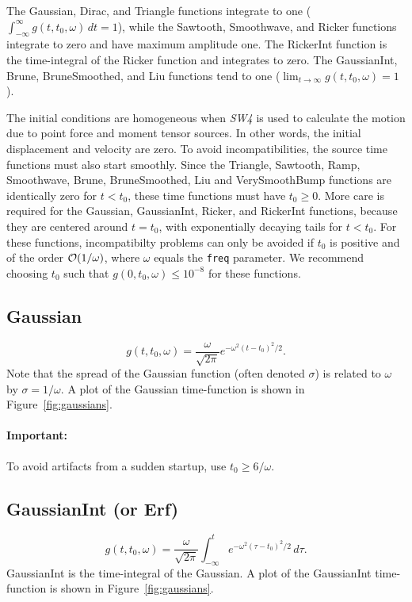 \documentclass[11pt]{report}
\begin{document}
The Gaussian, Dirac, and Triangle functions integrate to one ($\int_{-\infty}^{\infty}
g(t,t_0,\omega) \, dt = 1$), while the Sawtooth, Smoothwave, and Ricker functions integrate to zero
and have maximum amplitude one. The RickerInt function is the time-integral of the Ricker function
and integrates to zero. The GaussianInt, Brune, BruneSmoothed, and Liu functions tend to one
($\lim_{t\to\infty} g(t,t_0,\omega) = 1$).

The initial conditions are homogeneous when \emph{SW4} is used to calculate the motion due to point
force and moment tensor sources. In other words, the initial displacement and velocity are zero. To
avoid incompatibilities, the source time functions must also start smoothly. Since the Triangle,
Sawtooth, Ramp, Smoothwave, Brune, BruneSmoothed, Liu and VerySmoothBump functions are identically
zero for $t<t_0$, these time functions must have $t_0\geq 0$. More care is required for the
Gaussian, GaussianInt, Ricker, and RickerInt functions, because they are centered around $t=t_0$,
with exponentially decaying tails for $t<t_0$. For these functions, incompatibilty problems can only
be avoided if $t_0$ is positive and of the order ${\cal O}(1/\omega)$, where $\omega$ equals the
{\tt freq} parameter. We recommend choosing $t_0$ such that $g(0,t_0,\omega) \leq 10^{-8}$ for these
functions.

\subsection{Gaussian}\label{gaussian}
  \[
  g(t,t_0,\omega) = \dfrac{\omega}{\sqrt{2 \pi}} e^{-\omega^2 (t - t_0)^2 /2}.
  \] 
Note that the spread of the Gaussian function (often denoted $\sigma$) is related to $\omega$ by
$\sigma = 1 / \omega$. A plot of the Gaussian time-function is shown
in Figure~\ref{fig:gaussians}.
\paragraph{Important:} To avoid artifacts from a sudden startup, use
$t_0 \geq 6/\omega$.
\subsection{GaussianInt (or Erf)}\label{gaussianint}
\[
g(t,t_0,\omega) = \dfrac{\omega}{\sqrt{2 \pi}} \int_{-\infty}^t e^{-\omega^2 (\tau - t_0)^2/2}\,d\tau.
\] 
GaussianInt is the time-integral of the Gaussian. A plot of the
GaussianInt time-function is shown in Figure~\ref{fig:gaussians}.
\end{document}

